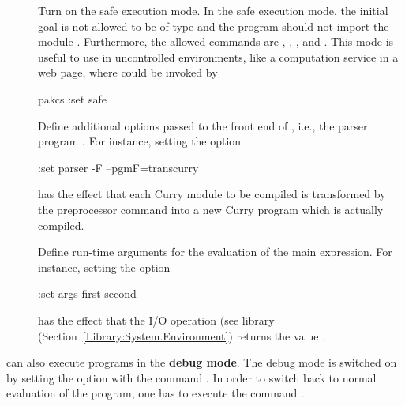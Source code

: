 \begin{description}
\item[]
Turn on the safe execution mode.
In the safe execution mode, the initial goal is
not allowed to be of type  and the program should not
import the module .
Furthermore, the allowed commands are
, , , and .
This mode is useful to use \CYS in uncontrolled environments,
like a computation service in a web page, where \CYS could
be invoked by
\begin{curry}
pakcs :set safe
\end{curry}

\item[]
Define additional options passed to the front end of \CYS, i.e.,
the parser program .
For instance, setting the option
\begin{curry}
:set parser -F --pgmF=transcurry
\end{curry}
has the effect that each Curry module to be compiled is
transformed by the preprocessor command 
into a new Curry program which is actually compiled.

\item[]
Define run-time arguments for the evaluation
of the main expression.
For instance, setting the option
\begin{curry}
:set args first second
\end{curry}
has the effect that the I/O operation 
(see library  (Section~\ref{Library:System.Environment})
returns the value .

\end{description}
%
\bigskip
%
\CYS can also execute programs in the {\bf debug mode}.
The debug mode is switched on by setting the  option
with the command . In order to switch
back to normal evaluation of the program, one has to execute
the command .

